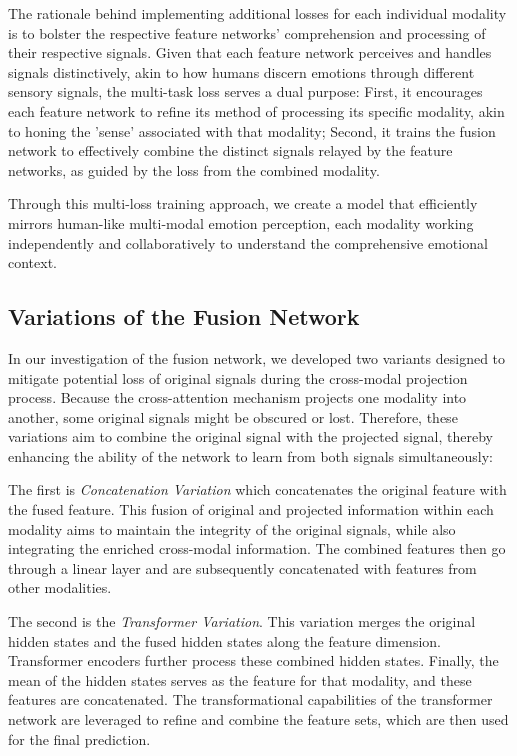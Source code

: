 \documentclass[11pt]{article}
\begin{document}
The rationale behind implementing additional losses for each individual modality is to bolster the respective feature networks' comprehension and processing of their respective signals.  Given that each feature network perceives and handles signals distinctively, akin to how humans discern emotions through different sensory signals, the multi-task loss serves a dual purpose: First, it encourages each feature network to refine its method of processing its specific modality, akin to honing the 'sense' associated with that modality; Second, it trains the fusion network to effectively combine the distinct signals relayed by the feature networks, as guided by the loss from the combined modality.

Through this multi-loss training approach, we create a model that efficiently mirrors human-like multi-modal emotion perception, each modality working independently and collaboratively to understand the comprehensive emotional context.

\subsection{Variations of the Fusion Network}
In our investigation of the fusion network, we developed two variants designed to mitigate potential loss of original signals during the cross-modal projection process. Because the cross-attention mechanism projects one modality into another, some original signals might be obscured or lost. Therefore, these variations aim to combine the original signal with the projected signal, thereby enhancing the ability of the network to learn from both signals simultaneously:

The first is {\it Concatenation Variation} which concatenates the original feature with the fused feature. This fusion of original and projected information within each modality aims to maintain the integrity of the original signals, while also integrating the enriched cross-modal information. The combined features then go through a linear layer and are subsequently concatenated with features from other modalities.  

The second is the {\it Transformer Variation}. This variation merges the original hidden states and the fused hidden states along the feature dimension. 
Transformer encoders further process these combined hidden states. Finally, the mean of the hidden states serves as the feature for that modality, and these features are concatenated. The transformational capabilities of the transformer network are leveraged to refine and combine the feature sets, which are then used for the final prediction.
\end{document}

